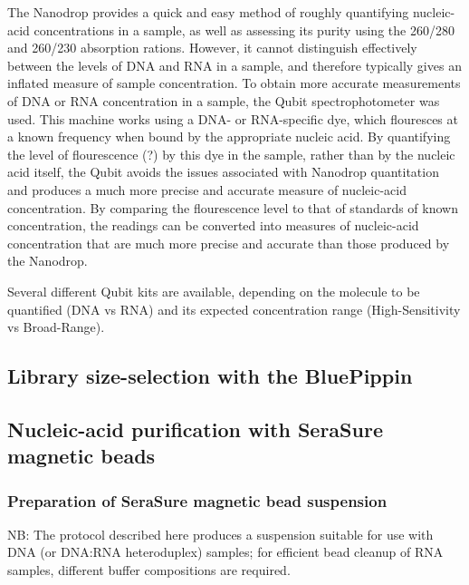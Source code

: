 The Nanodrop provides a quick and easy method of roughly quantifying nucleic-acid concentrations in a sample, as well as assessing its purity using the 260/280 and 260/230 absorption rations. However, it cannot distinguish effectively between the levels of DNA and RNA in a sample, and therefore typically gives an inflated measure of sample concentration. To obtain more accurate measurements of DNA or RNA concentration in a sample, the Qubit spectrophotometer was used. %
This machine works using a DNA- or RNA-specific dye, which flouresces at a known frequency when bound by the appropriate nucleic acid. %
By quantifying the level of flourescence (?) by this dye in the sample, rather than by the nucleic acid itself, the Qubit avoids the issues associated with Nanodrop quantitation and produces a much more precise and accurate measure of nucleic-acid concentration. By comparing the flourescence level to that of standards of known concentration, the readings can be converted into measures of nucleic-acid concentration that are much more precise and accurate than those produced by the Nanodrop.

Several different Qubit kits are available, depending on the molecule to be quantified (DNA vs RNA) and its expected concentration range (High-Sensitivity vs Broad-Range). 




\subsection{Library size-selection with the BluePippin}

\subsection{Nucleic-acid purification with SeraSure magnetic beads}

\subsubsection{Preparation of SeraSure magnetic bead suspension}

NB: The protocol described here produces a suspension suitable for use with DNA (or DNA:RNA heteroduplex) samples; for efficient bead cleanup of RNA samples, different buffer compositions are required.

